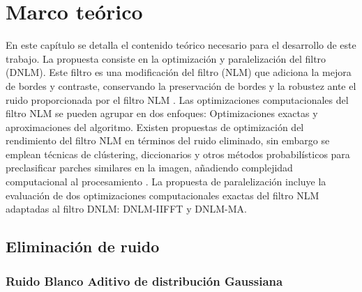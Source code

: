 \chapter{Marco teórico}
\label{ch:marco}


En este capítulo se detalla el contenido teórico necesario para el desarrollo de este trabajo. La propuesta consiste en la optimización y paralelización del filtro  (DNLM). Este filtro es una modificación del filtro  (NLM) que adiciona la mejora de bordes y contraste, conservando la preservación de bordes y la robustez ante el ruido proporcionada por el filtro NLM \cite{calderon2015dewaff}. 
Las optimizaciones computacionales del filtro NLM se pueden agrupar en dos enfoques: Optimizaciones exactas y aproximaciones del algoritmo. Existen propuestas de optimización del rendimiento del filtro NLM en términos del ruido eliminado, sin embargo se emplean técnicas de clústering, diccionarios y otros métodos probabilísticos para preclasificar parches similares en la imagen, a\~nadiendo complejidad computacional al procesamiento \cite{pardoNLM:2018,Chan2013,Tasdizen2009,Chatterjee2008,JI20091238,Karam2018}. 
La propuesta de paralelización incluye la evaluación de dos optimizaciones computacionales exactas del filtro NLM adaptadas al filtro DNLM: DNLM-IIFFT y DNLM-MA.



\section{Eliminación de ruido}

\subsection{Ruido Blanco Aditivo de distribución Gaussiana}
\label{ch:marco_agwn}

